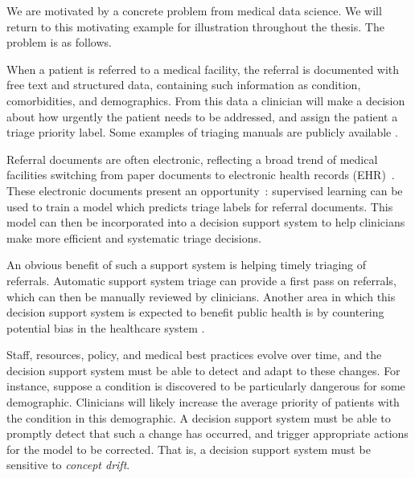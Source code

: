 We are motivated by a concrete problem from medical data science. We will return to this motivating example for illustration throughout the thesis. The problem is as follows.
\begin{displayquote}
  When a patient is referred to a medical facility, the referral is documented with free text and structured data, containing such information as condition, comorbidities, and demographics. From this data a clinician will make a decision about how urgently the patient needs to be addressed, and assign the patient a triage priority label. Some examples of triaging manuals are publicly available \cite{aus_triage}\cite{UK_mental_triage}\cite{musculoskeletal_services}.

  Referral documents are often electronic, reflecting a broad trend of medical facilities switching from paper documents to electronic health records (EHR)~\cite{ehr_adoption}. These electronic documents present an opportunity~\cite{ehr_opportunities}: supervised learning can be used to train a model which predicts triage labels for referral documents. This model can then be incorporated into a decision support system to help clinicians make more efficient and systematic triage decisions.

  An obvious benefit of such a support system is helping timely triaging of referrals. Automatic support system triage can provide a first pass on referrals, which can then be manually reviewed by clinicians. Another area in which this decision support system is expected to benefit public health is by countering potential bias in the healthcare system \cite{pdh}.

  Staff, resources, policy, and medical best practices evolve over time, and the decision support system must be able to detect and adapt to these changes. For instance, suppose a condition is discovered to be particularly dangerous for some demographic. Clinicians will likely increase the average priority of patients with the condition in this demographic. A decision support system must be able to promptly detect that such a change has occurred, and trigger appropriate actions for the model to be corrected. That is, a decision support system must be sensitive to {\it concept drift}.


\end{displayquote}
